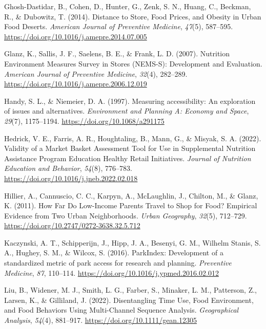\documentclass[
  letterpaper,
  number,
  review,
  3p]{elsarticle}
\newlength{\cslhangindent}
\newenvironment{CSLReferences}[2] %
 {\begin{list}{}{%
  \setlength{\itemindent}{0pt}
  \setlength{\leftmargin}{0pt}
  \setlength{\parsep}{0pt}
  \ifodd #1
   \setlength{\leftmargin}{\cslhangindent}
   \setlength{\itemindent}{-1\cslhangindent}
  \fi
  \setlength{\itemsep}{#2\baselineskip}}}
 {\end{list}}
\begin{document}
\begin{CSLReferences}{1}{0}
Ghosh-Dastidar, B., Cohen, D., Hunter, G., Zenk, S. N., Huang, C.,
Beckman, R., \& Dubowitz, T. (2014). Distance to {Store}, {Food Prices},
and {Obesity} in {Urban Food Deserts}. \emph{American Journal of
Preventive Medicine}, \emph{47}(5), 587--595.
\url{https://doi.org/10.1016/j.amepre.2014.07.005}

Glanz, K., Sallis, J. F., Saelens, B. E., \& Frank, L. D. (2007).
Nutrition {Environment Measures Survey} in {Stores} ({NEMS-S}):
{Development} and {Evaluation}. \emph{American Journal of Preventive
Medicine}, \emph{32}(4), 282--289.
\url{https://doi.org/10.1016/j.amepre.2006.12.019}

Handy, S. L., \& Niemeier, D. A. (1997). Measuring accessibility: {An}
exploration of issues and alternatives. \emph{Environment and Planning
A: Economy and Space}, \emph{29}(7), 1175--1194.
\url{https://doi.org/10.1068/a291175}

Hedrick, V. E., Farris, A. R., Houghtaling, B., Mann, G., \& Misyak, S.
A. (2022). Validity of a {Market Basket Assessment Tool} for {Use} in
{Supplemental Nutrition Assistance Program Education Healthy Retail
Initiatives}. \emph{Journal of Nutrition Education and Behavior},
\emph{54}(8), 776--783. \url{https://doi.org/10.1016/j.jneb.2022.02.018}

Hillier, A., Cannuscio, C. C., Karpyn, A., McLaughlin, J., Chilton, M.,
\& Glanz, K. (2011). How {Far Do Low-Income Parents Travel} to {Shop}
for {Food}? {Empirical Evidence} from {Two Urban Neighborhoods}.
\emph{Urban Geography}, \emph{32}(5), 712--729.
\url{https://doi.org/10.2747/0272-3638.32.5.712}

Kaczynski, A. T., Schipperijn, J., Hipp, J. A., Besenyi, G. M., Wilhelm
Stanis, S. A., Hughey, S. M., \& Wilcox, S. (2016). {ParkIndex}:
{Development} of a standardized metric of park access for research and
planning. \emph{Preventive Medicine}, \emph{87}, 110--114.
\url{https://doi.org/10.1016/j.ypmed.2016.02.012}

Liu, B., Widener, M. J., Smith, L. G., Farber, S., Minaker, L. M.,
Patterson, Z., Larsen, K., \& Gilliland, J. (2022). Disentangling {Time
Use}, {Food Environment}, and {Food Behaviors Using Multi-Channel
Sequence Analysis}. \emph{Geographical Analysis}, \emph{54}(4),
881--917. \url{https://doi.org/10.1111/gean.12305}


\end{CSLReferences}
\end{document}
